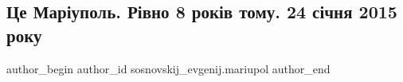  
 
 
 
 

\subsection{Це Маріуполь. Рівно 8 років тому. 24 січня 2015 року}
\label{sec:24_01_2023.fb.sosnovskij_evgenij.mariupol.1.tse_mar_upol__r_vno_}

\ifcmt
 author_begin
   author_id sosnovskij_evgenij.mariupol
 author_end
\fi
